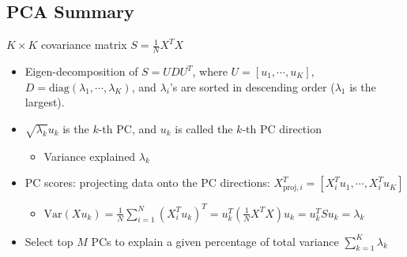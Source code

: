 \documentclass[10pt]{article}
\begin{document}
\subsection*{PCA Summary}
$K \times K$ covariance matrix $S = \frac{1}{N} X^T X$
\begin{itemize}
    \item Eigen-decomposition of $S = UDU^T$, where $U = [u_1, \cdots, u_K]$, $D = \text{diag}(\lambda_1, \cdots, \lambda_K)$, and $\lambda_i$'s are sorted in descending order ($\lambda_1$ is the largest).
    \item $\sqrt{\lambda_k} u_k$ is the $k$-th PC, and $u_k$ is called the $k$-th PC direction
    \begin{itemize}
	    \item Variance explained $\lambda_k$
    \end{itemize}
    \item PC scores: projecting data onto the PC directions: $X_{\text{proj}, i}^T = [X_i^T u_1, \cdots, X_i^T u_K]$
    \begin{itemize}
	    \item $\text{Var}(Xu_k) = \frac{1}{N} \sum_{i = 1}^N (X_i^T u_k)^T = u_k^T (\frac{1}{N} X^T X) u_k = u_k^T Su_k = \lambda_k$
    \end{itemize}
    \item Select top $M$ PCs to explain a given percentage of total variance $\sum_{k = 1}^K \lambda_k$
\end{itemize}
\end{document}

